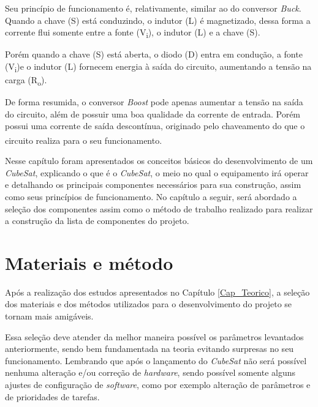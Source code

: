 \documentclass[
	12pt,				%
	openright,			%
	oneside,			%
	a4paper,			%
	english,			%
	french,				%
	spanish,			%
	brazil,				%
	oldfontcommands
	]{abntex2}
\begin{document}
	Seu princípio de funcionamento é, relativamente, similar ao do conversor \textit{Buck}. Quando a chave (S) está conduzindo, o indutor (L) é magnetizado, dessa forma a corrente flui somente entre a fonte (V\textsubscript{i}), o indutor (L) e a chave (S).
	
	Porém quando a chave (S) está aberta, o diodo (D) entra em condução, a fonte (V\textsubscript{i})e o indutor (L) fornecem energia à saída do circuito, aumentando a tensão na carga (R\textsubscript{o}).
	
	De forma resumida, o conversor \textit{Boost} pode apenas aumentar a tensão na saída do circuito, além de possuir uma boa qualidade da corrente de entrada. Porém possui uma corrente de saída descontínua, originado pelo chaveamento do que o circuito realiza para o seu funcionamento.\textsuperscript{\cite{inep}}
	
	Nesse capítulo foram apresentados os conceitos básicos do desenvolvimento de um \textit{CubeSat}, explicando o que é o \textit{CubeSat}, o meio no qual o equipamento irá operar e detalhando os principais componentes necessários para sua construção, assim como seus princípios de funcionamento. No capítulo a seguir, será abordado a seleção dos componentes assim como o método de trabalho realizado para realizar a construção da lista de componentes do projeto.


\chapter[Materiais e método]{Materiais e método}

	Após a realização dos estudos apresentados no Capítulo \ref{Cap_Teorico}, a seleção dos materiais e dos métodos utilizados para o desenvolvimento do projeto se tornam mais amigáveis. 
	
	Essa seleção deve atender da melhor maneira possível os parâmetros levantados anteriormente, sendo bem fundamentada na teoria evitando surpresas no seu funcionamento. Lembrando que após o lançamento do \textit{CubeSat} não será possível nenhuma alteração e/ou correção de \textit{hardware}, sendo possível somente alguns ajustes de configuração de \textit{software}, como por exemplo alteração de parâmetros e de prioridades de tarefas.
	
\end{document}
